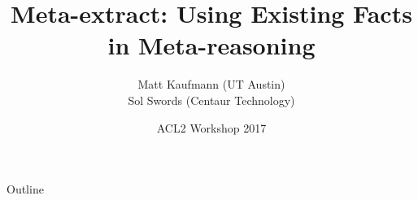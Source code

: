 
\newcommand\mydotdot{{\color{orange} ...}}





\begin{frame}
\title{Meta-extract: Using Existing Facts in Meta-reasoning}
\author{
        Matt Kaufmann (UT Austin) \\
        Sol Swords (Centaur Technology)
}
\date{
        \vspace{1cm}
        ACL2 Workshop 2017
}
\titlepage
\end{frame}
\begin{frame}{\hspace{4mm}Outline}
\tableofcontents
\end{frame}
